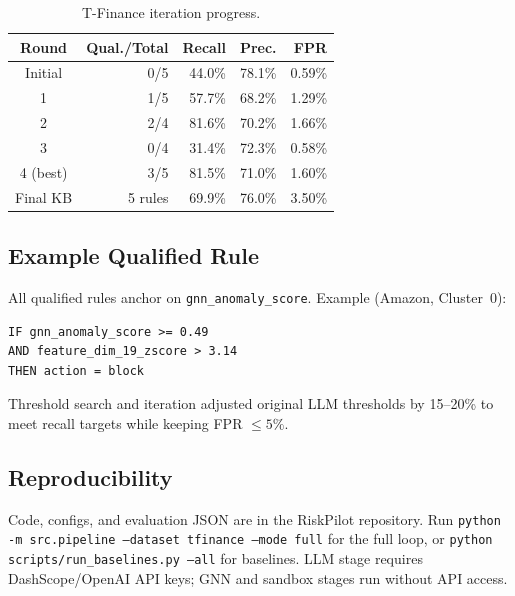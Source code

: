 \documentclass[sigconf,nonacm]{acmart}
\begin{document}
\begin{table}[h]
\caption{T-Finance iteration progress.}
\label{tab:iter}
\footnotesize
\begin{tabular}{crrrr}
\toprule
Round & Qual./Total & Recall & Prec. & FPR \\
\midrule
Initial & 0/5 & 44.0\% & 78.1\% & 0.59\% \\
1       & 1/5 & 57.7\% & 68.2\% & 1.29\% \\
2       & 2/4 & 81.6\% & 70.2\% & 1.66\% \\
3       & 0/4 & 31.4\% & 72.3\% & 0.58\% \\
4 (best)& 3/5 & 81.5\% & 71.0\% & 1.60\% \\
\midrule
Final KB & 5 rules & 69.9\% & 76.0\% & 3.50\% \\
\bottomrule
\end{tabular}
\end{table}

\subsection{Example Qualified Rule}
All qualified rules anchor on \texttt{gnn\_anomaly\_score}. Example (Amazon, Cluster~0):
\begin{verbatim}
IF gnn_anomaly_score >= 0.49
AND feature_dim_19_zscore > 3.14
THEN action = block
\end{verbatim}
Threshold search and iteration adjusted original LLM thresholds by 15--20\% to meet recall targets while keeping FPR $\leq 5\%$.

\subsection{Reproducibility}
Code, configs, and evaluation JSON are in the RiskPilot repository.
Run \texttt{python -m src.pipeline --dataset tfinance --mode full} for the full loop, or \texttt{python scripts/run\_baselines.py --all} for baselines.
LLM stage requires DashScope/OpenAI API keys; GNN and sandbox stages run without API access.
\end{document}
